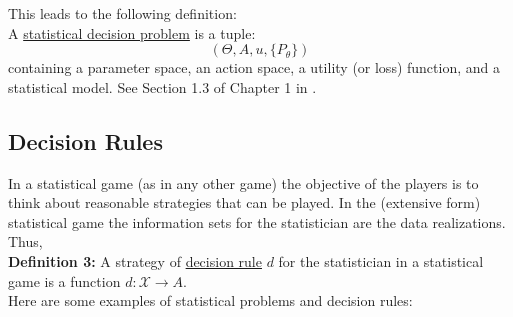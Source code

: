 \documentclass[11pt]{article} %
\begin{document}
This leads to the following definition:\\

 A \underline{statistical decision problem} is a tuple: 
\[(\Theta, A, u, \{P_{\theta}\})\] 
containing a parameter space, an action space, a utility (or loss) function, and a statistical model. See Section 1.3 of Chapter 1 in \cite{Ferguson67}.\\



\subsection{Decision Rules}



In a statistical game (as in any other game) the objective of the players is to think about reasonable strategies that can be played. In the (extensive form) statistical game the information sets for the statistician are the data realizations. Thus,\\

\noindent \textbf{Definition 3:} A strategy of \underline{decision rule} $d$ for the statistician in a statistical game is a function $d: \mathcal{X} \rightarrow A$.  \\

Here are some examples of statistical problems and decision rules: 
\end{document}
